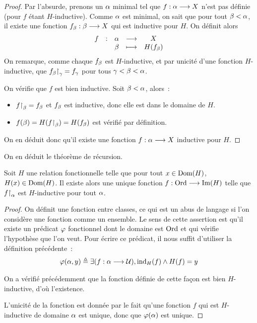 \begin{proof}
  Par l'absurde, prenons un $\alpha$ minimal tel que
  $f : \displaystyle \alpha \longrightarrow X$ n'est
  pas définie (pour $f$ étant $H$-inductive). Comme $\alpha$ est minimal, on
  sait que pour tout $\beta < \alpha$, il existe une fonction
  $f_{\beta} : \displaystyle \beta \longrightarrow X$ qui est inductive pour $H$. On définit
  alors
  \[\makeFun{f}{\varOa}{X}{\varOb}{H(f_{\varOb})}\]
  On remarque, comme chaque $f_{\beta}$ est $H$-inductive, et par unicité d'une
  fonction $H$-inductive, que $f_{\beta}\mathbin{\upharpoonright}_{\gamma} = f_{\gamma}$ pour tous
  $\gamma < \beta < \alpha$.

  On vérifie que $f$ est bien inductive. Soit $\beta < \alpha$, alors~:
  \begin{itemize}
  \item $f\mathbin{\upharpoonright}_{\beta} = f_{\beta}$ et $f_{\beta}$ est inductive, donc elle
    est dans le domaine de $H$.
  \item $f(\beta)=H(f\mathbin{\upharpoonright}_{\beta})=H(f_{\beta})$ est vérifié par définition.
  \end{itemize}

  On en déduit donc qu'il existe une fonction $f : \displaystyle \alpha \longrightarrow X$
  inductive pour $H$.
\end{proof}

\noindent
On en déduit le théorème de récursion.

\begin{theorem}\label{thm.recurs.transf}
  Soit $H$ une relation fonctionnelle telle que pour tout $x\in \operatorname{Dom}(H)$,
  $H(x)\in\operatorname{Dom}(H)$. Il existe alors une unique fonction
  $f : \displaystyle \operatorname{Ord} \longrightarrow \operatorname{Im}(H)$ telle que $f\mathbin{\upharpoonright}_{\alpha}$ est $H$-inductive
  pour tout $\alpha$.
\end{theorem}

\begin{proof}
  On définit une fonction entre classes, ce qui est un abus de langage si l'on
  considère une fonction comme un ensemble. Le sens de cette assertion est qu'il
  existe un prédicat $\varphi$ fonctionnel dont le domaine est $\operatorname{Ord}$ et qui
  vérifie l'hypothèse que l'on veut. Pour écrire ce prédicat, il nous suffit
  d'utiliser la définition précédente~:
  \[\varphi(\alpha,y) \triangleq \exists (f : \displaystyle \alpha \longrightarrow \mathcal{U}),
  \operatorname{ind}_H(f)\land H(f) = y\]

  On a vérifié précédemment que la fonction définie de cette façon est bien
  $H$-inductive, d'où l'existence.

  L'unicité de la fonction est donnée par le fait qu'une fonction $f$ qui est
  $H$-inductive de domaine $\alpha$ est unique, donc que $\varphi(\alpha)$ est
  unique.
\end{proof}

